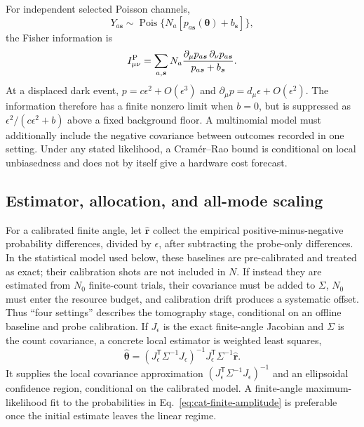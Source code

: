 \documentclass[aps,pra,reprint,amsmath,amssymb,superscriptaddress,longbibliography]{revtex4-2}
\newcommand{\btheta}{\bm{\theta}}
\begin{document}
For independent selected Poisson channels,
\begin{equation}
 Y_{a\bm s}\sim\operatorname{Pois}
 \{N_a[p_{a\bm s}(\btheta)+b_{\bm s}]\},
\end{equation}
the Fisher information is
\begin{equation}
 I_{\mu\nu}^{\rm P}
 =\sum_{a,\bm s}N_a
 \frac{\partial_\mu p_{a\bm s}\,\partial_\nu p_{a\bm s}}
 {p_{a\bm s}+b_{\bm s}}.
\label{eq:poisson-fi}
\end{equation}
At a displaced dark event,
$p=c\epsilon^2+O(\epsilon^3)$ and
$\partial_\mu p=d_\mu\epsilon+O(\epsilon^2)$.  The information therefore
has a finite nonzero limit when $b=0$, but is suppressed as
$\epsilon^2/(c\epsilon^2+b)$ above a fixed background floor.  A multinomial
model must additionally include the negative covariance between outcomes
recorded in one setting.  Under any stated likelihood, a Cramér--Rao bound
is conditional on local unbiasedness and does not by itself give a hardware
cost forecast.

\subsection{Estimator, allocation, and all-mode scaling}

For a calibrated finite angle, let $\widehat{\bm r}$ collect the empirical
positive-minus-negative probability differences, divided by $\epsilon$,
after subtracting the probe-only differences.  In the statistical model
used below, these baselines are pre-calibrated and treated as exact; their
calibration shots are not included in $N$.  If instead they are estimated
from $N_0$ finite-count trials, their covariance must be added to $\Sigma$,
$N_0$ must enter the resource budget, and calibration drift produces a
systematic offset.  Thus ``four settings'' describes the tomography stage,
conditional on an offline baseline and probe calibration.  If $J_\epsilon$ is
the exact finite-angle Jacobian and $\Sigma$ is the count covariance, a
concrete local estimator is weighted least squares,
\begin{equation}
 \widehat{\btheta}
 =(J_\epsilon^{\mathsf T}\Sigma^{-1}J_\epsilon)^{-1}
 J_\epsilon^{\mathsf T}\Sigma^{-1}\widehat{\bm r}.
\label{eq:wls-estimator}
\end{equation}
It supplies the local covariance approximation
$(J_\epsilon^{\mathsf T}\Sigma^{-1}J_\epsilon)^{-1}$ and an ellipsoidal
confidence region, conditional on the calibrated model.  A finite-angle
maximum-likelihood fit to the probabilities in
Eq.~\eqref{eq:cat-finite-amplitude} is preferable once the initial estimate
leaves the linear regime.
\end{document}
